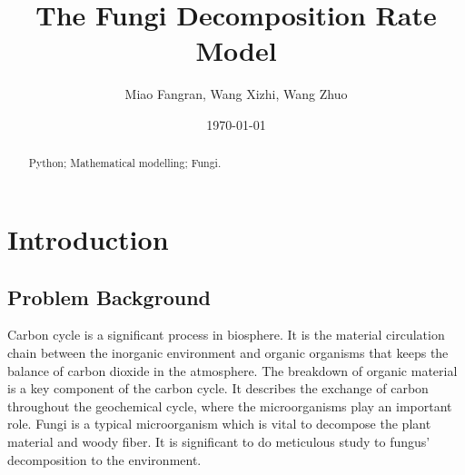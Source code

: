 \documentclass{mcmthesis}
\title{The Fungi Decomposition Rate Model}
\author{Miao Fangran, Wang Xizhi, Wang Zhuo}
\date{\today}
\begin{document}
\begin{abstract}

\begin{keywords}
Python; Mathematical modelling; Fungi.
\end{keywords}
\end{abstract}
\maketitle
\tableofcontents
\newpage
\section{Introduction}
\subsection{Problem Background}
Carbon cycle is a significant process in biosphere. 
It is the material circulation chain between the inorganic environment and organic organisms that keeps the balance of carbon dioxide in the atmosphere. 
The breakdown of organic material is a key component of the carbon cycle. 
It describes the exchange of carbon throughout the geochemical cycle, where the microorganisms play an important role. 
Fungi is a typical microorganism which is vital to decompose the plant material and woody fiber. 
It is significant to do meticulous study to fungus’ decomposition to the environment.
\end{document}
